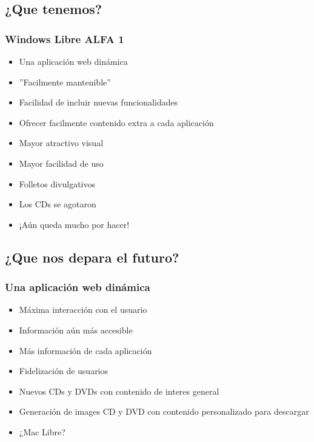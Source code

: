 	\subsection{¿Que tenemos?} %
	\begin{frame}
		\frametitle{Windows Libre ALFA 1}
		\begin{itemize}
			\item <1-| alert@1> Una aplicación web dinámica
			\item <2-| alert@2> ''Facilmente mantenible''
			\item <3-| alert@3> Facilidad de incluir nuevas funcionalidades
			\item <4-| alert@4> Ofrecer facilmente contenido extra a cada aplicación
			\item <5-| alert@5> Mayor atractivo visual
			\item <6-| alert@6> Mayor facilidad de uso
			\item <7-| alert@7> Folletos divulgativos
			\item <8-| alert@8> Los CDs se agotaron
			\item <9-| alert@9> ¡Aún queda mucho por hacer!
		\end{itemize}
	\end{frame}

	\subsection{¿Que nos depara el futuro?} %
	\begin{frame}
		\frametitle{Una aplicación web dinámica}
		\setbeamercovered{invisible}
		\begin{itemize}
			\item <1-| alert@1> Máxima interacción con el usuario
			\item <1-| alert@1> Información aún más accesible %
			\item <1-| alert@1> Más información de cada aplicación
			\item <1-| alert@1> Fidelización de usuarios
			\item <1-| alert@1> Nuevos CDs y DVDs con contenido de interes general
			\item <1-| alert@1> Generación de images CD y DVD con contenido personalizado para descargar
			\item <1-| alert@1> ¿Mac Libre?
		\end{itemize}
	\end{frame}